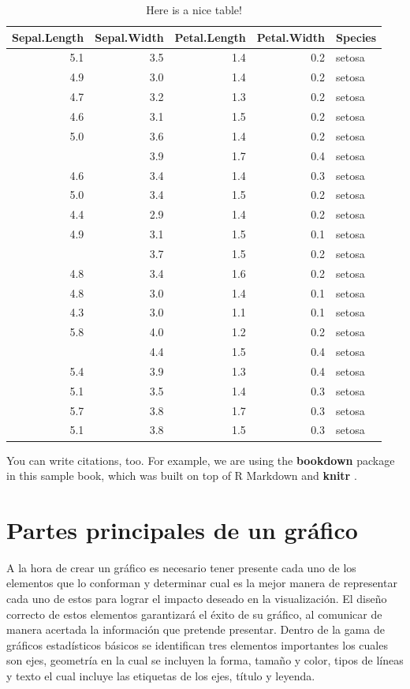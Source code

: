 \documentclass[
]{book}
\begin{document}
\begin{table}

\caption{\label{tab:nice-tab}Here is a nice table!}
\centering
\begin{tabular}[t]{rrrrl}
\toprule
Sepal.Length & Sepal.Width & Petal.Length & Petal.Width & Species\\
\midrule
5.1 & 3.5 & 1.4 & 0.2 & setosa\\
4.9 & 3.0 & 1.4 & 0.2 & setosa\\
4.7 & 3.2 & 1.3 & 0.2 & setosa\\
4.6 & 3.1 & 1.5 & 0.2 & setosa\\
5.0 & 3.6 & 1.4 & 0.2 & setosa\\
\addlinespace
5.4 & 3.9 & 1.7 & 0.4 & setosa\\
4.6 & 3.4 & 1.4 & 0.3 & setosa\\
5.0 & 3.4 & 1.5 & 0.2 & setosa\\
4.4 & 2.9 & 1.4 & 0.2 & setosa\\
4.9 & 3.1 & 1.5 & 0.1 & setosa\\
\addlinespace
5.4 & 3.7 & 1.5 & 0.2 & setosa\\
4.8 & 3.4 & 1.6 & 0.2 & setosa\\
4.8 & 3.0 & 1.4 & 0.1 & setosa\\
4.3 & 3.0 & 1.1 & 0.1 & setosa\\
5.8 & 4.0 & 1.2 & 0.2 & setosa\\
\addlinespace
5.7 & 4.4 & 1.5 & 0.4 & setosa\\
5.4 & 3.9 & 1.3 & 0.4 & setosa\\
5.1 & 3.5 & 1.4 & 0.3 & setosa\\
5.7 & 3.8 & 1.7 & 0.3 & setosa\\
5.1 & 3.8 & 1.5 & 0.3 & setosa\\
\bottomrule
\end{tabular}
\end{table}

You can write citations, too. For example, we are using the \textbf{bookdown} package \citep{R-bookdown} in this sample book, which was built on top of R Markdown and \textbf{knitr} \citep{xie2015}.

\hypertarget{partes-principales-de-un-gruxe1fico}{%
\chapter{Partes principales de un gráfico}\label{partes-principales-de-un-gruxe1fico}}

A la hora de crear un gráfico es necesario tener presente cada uno de los elementos que lo conforman y determinar cual es la mejor manera de representar cada uno de estos para lograr el impacto deseado en la visualización. El diseño correcto de estos elementos garantizará el éxito de su gráfico, al comunicar de manera acertada la información que pretende presentar. Dentro de la gama de gráficos estadísticos básicos se identifican tres elementos importantes los cuales son ejes, geometría en la cual se incluyen la forma, tamaño y color, tipos de líneas y texto el cual incluye las etiquetas de los ejes, título y leyenda.
\end{document}
